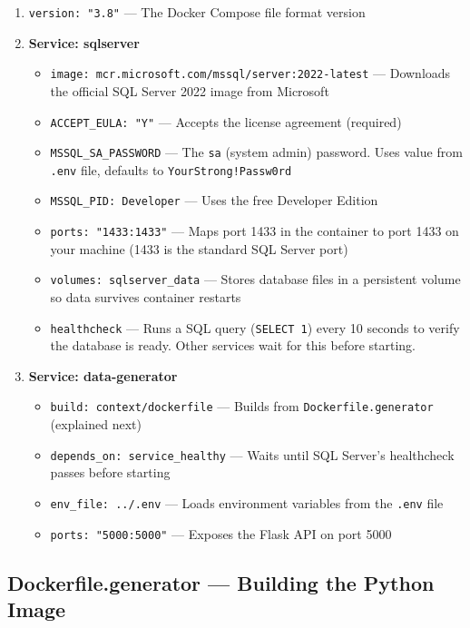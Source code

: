\documentclass[12pt, a4paper, oneside]{report}
\begin{document}
\begin{enumerate}[label=\textcolor{primary}{\textbf{\arabic*.}}]
    \item \texttt{version: "3.8"} --- The Docker Compose file format version

    \item \textbf{Service: sqlserver}
    \begin{itemize}
        \item \texttt{image: mcr.microsoft.com/mssql/server:2022-latest} --- Downloads the official SQL Server 2022 image from Microsoft
        \item \texttt{ACCEPT\_EULA: "Y"} --- Accepts the license agreement (required)
        \item \texttt{MSSQL\_SA\_PASSWORD} --- The \texttt{sa} (system admin) password. Uses value from \texttt{.env} file, defaults to \texttt{YourStrong!Passw0rd}
        \item \texttt{MSSQL\_PID: Developer} --- Uses the free Developer Edition
        \item \texttt{ports: "1433:1433"} --- Maps port 1433 in the container to port 1433 on your machine (1433 is the standard SQL Server port)
        \item \texttt{volumes: sqlserver\_data} --- Stores database files in a persistent volume so data survives container restarts
        \item \texttt{healthcheck} --- Runs a SQL query (\texttt{SELECT 1}) every 10 seconds to verify the database is ready. Other services wait for this before starting.
    \end{itemize}

    \item \textbf{Service: data-generator}
    \begin{itemize}
        \item \texttt{build: context/dockerfile} --- Builds from \texttt{Dockerfile.generator} (explained next)
        \item \texttt{depends\_on: service\_healthy} --- Waits until SQL Server's healthcheck passes before starting
        \item \texttt{env\_file: ../.env} --- Loads environment variables from the \texttt{.env} file
        \item \texttt{ports: "5000:5000"} --- Exposes the Flask API on port 5000
    \end{itemize}
\end{enumerate}

\subsection{Dockerfile.generator --- Building the Python Image}
\end{document}
